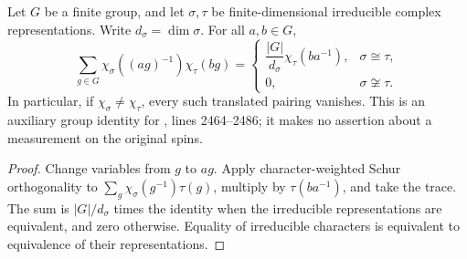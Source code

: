 \begin{lemma}
    \label{thm:peps_translated_character_pairing}
    \leanok
    Let $G$ be a finite group, and let $\sigma,\tau$ be finite-dimensional
    irreducible complex representations. Write $d_\sigma=\dim\sigma$.
    For all $a,b\in G$,
    \[
        \sum_{g\in G}\chi_\sigma((ag)^{-1})\chi_\tau(bg)
        =\begin{cases}
            \dfrac{|G|}{d_\sigma}\chi_\tau(ba^{-1}), & \sigma\cong\tau,     \\
            0,                                       & \sigma\not\cong\tau.
        \end{cases}
    \]
    In particular, if $\chi_\sigma\ne\chi_\tau$, every such translated pairing
    vanishes. This is an auxiliary group identity for
    \cite[charge-detection proof]{Schuch2010PEPS}, lines 2464--2486;
    it makes no assertion about a measurement on the original spins.
\end{lemma}
\begin{proof}\leanok
    Change variables from $g$ to $ag$. Apply character-weighted Schur
    orthogonality to $\sum_g\chi_\sigma(g^{-1})\tau(g)$, multiply by
    $\tau(ba^{-1})$, and take the trace. The sum is $|G|/d_\sigma$ times the
    identity when the irreducible representations are equivalent, and zero
    otherwise. Equality of irreducible characters is equivalent to equivalence
    of their representations.
\end{proof}

